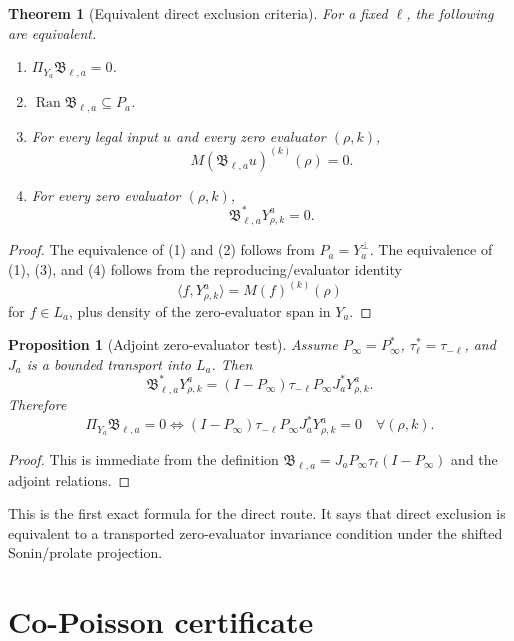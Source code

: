 \documentclass[11pt]{article}
\newtheorem{theorem}{Theorem}
\newtheorem{proposition}{Proposition}
\newcommand{\Ran}{\operatorname{Ran}}
\begin{document}
\begin{theorem}[Equivalent direct exclusion criteria]
For a fixed \(\ell\), the following are equivalent.
\begin{enumerate}
\item \(\Pi_{Y_a}\mathfrak B_{\ell,a}=0\).
\item \(\Ran \mathfrak B_{\ell,a}\subseteq P_a\).
\item For every legal input \(u\) and every zero evaluator \((\rho,k)\),
\[
        M(\mathfrak B_{\ell,a}u)^{(k)}(\rho)=0.
\]
\item For every zero evaluator \((\rho,k)\),
\[
        \mathfrak B_{\ell,a}^{*}Y^a_{\rho,k}=0.
\]
\end{enumerate}
\end{theorem}

\begin{proof}
The equivalence of (1) and (2) follows from \(P_a=Y_a^\perp\). The equivalence of (1), (3), and (4) follows from the reproducing/evaluator identity
\[
        \langle f,Y^a_{\rho,k}\rangle=M(f)^{(k)}(\rho)
\]
for \(f\in L_a\), plus density of the zero-evaluator span in \(Y_a\).
\end{proof}

\begin{proposition}[Adjoint zero-evaluator test]
Assume \(P_\infty=P_\infty^*\), \(\tau_\ell^*=\tau_{-\ell}\), and \(J_a\) is a bounded transport into \(L_a\). Then
\[
        \boxed{
        \mathfrak B_{\ell,a}^{*}Y^a_{\rho,k}
        =(I-P_\infty)\tau_{-\ell}P_\infty J_a^*Y^a_{\rho,k}.
        }
\]
Therefore
\[
        \boxed{
        \Pi_{Y_a}\mathfrak B_{\ell,a}=0
        \iff
        (I-P_\infty)\tau_{-\ell}P_\infty J_a^*Y^a_{\rho,k}=0
        \quad\forall(\rho,k).
        }
\]
\end{proposition}

\begin{proof}
This is immediate from the definition
\(\mathfrak B_{\ell,a}=J_aP_\infty\tau_\ell(I-P_\infty)\)
and the adjoint relations.
\end{proof}

This is the first exact formula for the direct route. It says that direct exclusion is equivalent to a transported zero-evaluator invariance condition under the shifted Sonin/prolate projection.

\section{Co-Poisson certificate}
\end{document}
